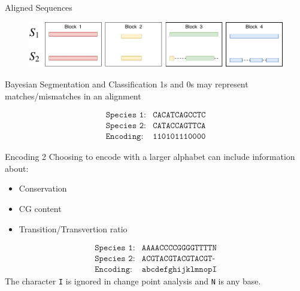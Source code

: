 \documentclass{beamer}
\begin{document}
    \begin{frame}{Aligned Sequences}
        \begin{figure}
            \centering
            \includegraphics[width=\textwidth]{Aligned.pdf}
            \label{fig:aligned}
        \end{figure}
    \end{frame}
    \begin{frame}{Bayesian Segmentation and Classification}
        1s and 0s may represent matches/mismatches in an alignment
        
        \begin{align*}
            \texttt{Species 1:}&\texttt{CACATCAGCCTC}\\
            \texttt{Species 2:}&\texttt{CATACCAGTTCA}\\
            \texttt{Encoding:}&\texttt{110101110000}
        \end{align*}
        
    
    \end{frame}
    
    \begin{frame}{Encoding 2}
    Choosing to encode with a larger alphabet can include information about:
        \begin{itemize}
            \item Conservation
            \item CG content
            \item Transition/Transvertion ratio
        \end{itemize}
        \begin{align*}
            \texttt{Species 1:}&\texttt{AAAACCCCGGGGTTTTN}\\
            \texttt{Species 2:}&\texttt{ACGTACGTACGTACGT-}\\
            \texttt{Encoding:}&\texttt{abcdefghijklmnopI}
        \end{align*}
    The character \texttt{I} is ignored in change point analysis and \texttt{N} is any base.
    \end{frame}
    
    
\end{document}
